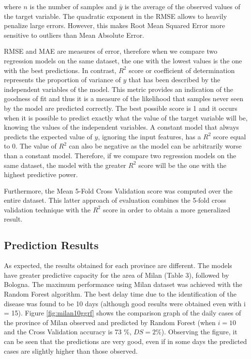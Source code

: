 \documentclass[review]{elsarticle}
\begin{document}
where $ n $ is the number of samples and $ \bar{y}$ is the average of the observed values of the target variable. The quadratic exponent in the RMSE allows to heavily penalize  large errors. However, this makes Root Mean Squared Error more sensitive to outliers than Mean Absolute Error.

RMSE and MAE are measures of error, therefore when we compare two regression models on the same dataset, the one with the lowest values is the one with the best predictions. In contrast, $ R^2 $ score or coefficient of determination represents the proportion of variance of $y$ that has been described by the independent variables of the model. This metric provides an indication of the goodness of fit and thus it is a measure of the likelihood that samples never seen by the model are predicted correctly. The best possible score is 1 and it occurs when it is possible to predict exactly what the value of the target variable will be, knowing the values of the independent variables. A constant model that always predicts the expected value of $y$, ignoring the input features, has a $ R^2 $ score equal to 0. The value of $ R^2 $ can also be negative as the model can be arbitrarily worse than a constant model. Therefore, if we compare two regression models on the same dataset, the model with the greater $ R^2 $ score will be the one with the highest predictive power.

Furthermore, the Mean 5-Fold Cross Validation score was computed over the entire dataset. This latter approach of evaluation combines the 5-fold cross validation technique with the $ R^2 $ score in order to obtain a more generalized result.

\subsection{Prediction Results}
As expected, the results obtained for each province are different. The models have greater predictive capacity for the area of Milan (Table 3), followed by Bologna. The maximum performance using Milan dataset was achieved with the Random Forest algorithm. The best delay time due to the identification of the disease was found to be 10 days (although good results were obtained even with i = 15). Figure \ref{fig:milan10ggrf} shows the comparison graph of the daily cases of the province of Milan observed and predicted by Random Forest (when $ i = 10 $ and the Cross Validation accuracy is 73 \%, $ DS = 2 \% $). Observing the figure, it can be seen that the predictions are very good, even if in some days the predicted cases are slightly higher than those observed.
\end{document}
